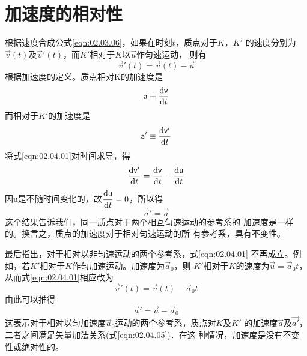\section{加速度的相对性}\label{sec:02.04}
    根据速度合成公式\eqref{eqn:02.03.06}，如果在时刻$t$，质点对于$K$，$K'$
的速度分别为$\vec{v}(t)$及$\vec{v}'(t)$，而$K'$相对于$K$以$\vec{u}$作匀速运动，
\clearpage
\noindent 则有\vspace{-1.8em}
\begin{equation}\label{eqn:02.04.01}
    \vec{v}'(t)=\vec{v}(t)-\vec{u}
\end{equation}
根据加速度的定义。质点相对K的加速度是
\begin{equation}\label{eqn:02.04.02}
    {\mathsf{a}}\equiv\frac{{\rm d} {\mathsf{v}}}{{\rm d} t}
\end{equation}
而相对于$K'$的加速度是
\begin{equation}\label{eqn:02.04.03}
    {\mathsf{a}}'\equiv\frac{{\rm d} {\mathsf{v}}'}{{\rm d} t}
\end{equation}
将式\eqref{eqn:02.04.01}对时间求导，得
\begin{equation}
    \frac{{\rm d} {\mathsf{v}}'}{{\rm d} t}=\frac{{\rm d} {\mathsf{v}}}{{\rm d} t}-\frac{{\rm d} {\mathsf{u}}}{{\rm d} t}
\end{equation}
因u是不随时间变化的，故$\dfrac{{\rm d} {\mathsf{u}}}{{\rm d} t}=0$，所以得
\begin{equation}\label{eqn:02.04.04}
    \vec{a}'=\vec{a}
\end{equation}
这个结果告诉我们，同一质点对于两个相互匀速运动的参考系的
加速度是一样的。换言之，质点的加速度对于相对匀速运动的所
有参考系，具有不变性。

最后指出，对于相对以非匀速运动的两个参考系，式\eqref{eqn:02.04.01}
不再成立。例如，若$K'$相对于$K$作匀加速运动。加速度为$\vec{a}_0$，则
$K'$相对于$K$的速度为$\vec{u}=\vec{a}_0t$，从而式\eqref{eqn:02.04.01}相应改为
\begin{equation*}
    \vec{v}'(t)=\vec{v}(t)-\vec{a}_0t
\end{equation*}
由此可以推得
\begin{equation}\label{eqn:02.04.05}
    \vec{a}'=\vec{a} - \vec{a}_0
\end{equation}
这表示对于相对以匀加速度$\vec{a}_0$运动的两个参考系，质点对$K$及$K'$
的加速度$\vec{a}$及$\vec{a'}$，二者之间满足矢量加法关系(式\eqref{eqn:02.04.05})．在这
种情况，加速度是没有不变性或绝对性的。
